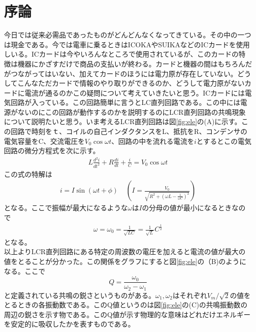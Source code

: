 \section{序論}
今日では従来必需品であったものがどんどんなくなってきている。その中の一つは現金である。今では電車に乗るときはICOKAやSUIKAなどのICカードを使用しいる。ICカードは今やいろんなところで使用されているが、このカードの特徴は機器にかざすだけで商品の支払いが終わる。カードと機器の間はもちろんだがつながってはいない、加えてカードのほうには電力原が存在していない。どうしてこんなただカードで情報のやり取りができるのか、どうして電力原がないカードに電流が通るのかこの疑問について考えていきたいと思う。ICカードには電気回路が入っている。この回路簡単に言うとLC直列回路である。この中には電源がないのにこの回路が動作するのかを説明するのにLCR直列回路の共鳴現象について説明たいと思う。いま考えるLCR直列回路は図\ref{fig:ele}の(A)に示す。この回路で時刻をｔ、コイルの自己インダクタンスをL、抵抗をR、コンデンサの電気容量をC、交流電圧を$V_0 \cos{\omega t}$、回路の中を流れる電流を$i$とするとこの電気回路の微分方程式を次に示す。
\begin{eqnarray}
L\frac{d^2i}{dt^2}+R\frac{di}{dt}+\frac{i}{C}=V_0\cos{\omega t}
\end{eqnarray}
この式の特解は
\begin{eqnarray}
i=I\sin(\omega t + \phi)\ \ \ \ \ \left(I=\frac{V_0}{\sqrt{R^2+(\omega L- \frac{1}{\omega C})^2}}\right)
\end{eqnarray}
となる。ここで振幅が最大になるような$\omega $は$I$の分母の値が最小になるときなので
\begin{eqnarray}
\omega =\omega_0=\frac{1}{\sqrt{LC}}=\frac{1}{\sqrt{L}}C^\frac{1}{2}
\end{eqnarray}
となる。\\
以上よりLCR直列回路にある特定の周波数の電圧を加えると電流の値が最大の値をとることが分かった。この関係をグラフにすると図\ref{fig:ele}の（B)のようになる。ここで
\[
Q=\frac{\omega_0}{\omega_2-\omega_1}
\]
と定義されている共鳴の鋭さというものがある。$\omega_1,\omega_2$はそれぞれ$V_m/\sqrt{2}$の値をとるときの各振動数である。このQ値というのは図\ref{fig:ele}の(C)の共鳴振動数の周辺の鋭さを示す物である。このQ値が示す物理的な意味はどれだけエネルギーを安定的に吸収したかを表すものである。

